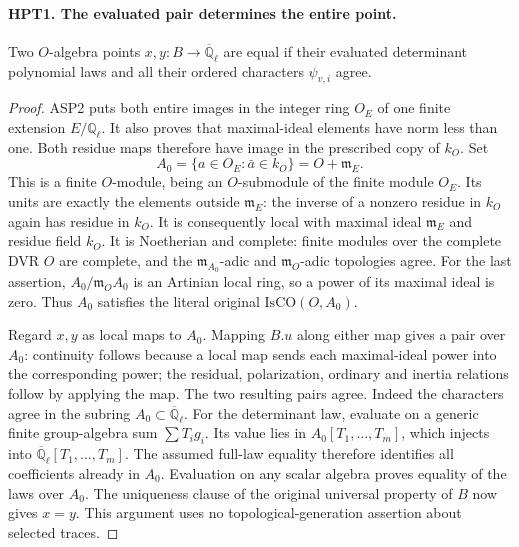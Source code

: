 \documentclass[11pt,a4paper]{article}
\numberwithin{equation}{section}
\theoremstyle{remark}\newtheorem{remark}[theorem]{Remark}
\begin{document}
\paragraph{HPT1. The evaluated pair determines the entire point.}
\label{claim:HPT1}
Two $O$-algebra points $x,y:B\to\overline{\mathbb Q}_\ell$ are equal
if their evaluated determinant polynomial laws and all their ordered
characters $\psi_{v,i}$ agree.
\begin{proof}
ASP2 puts both entire images in the integer ring $O_E$ of one finite
extension $E/\mathbb Q_\ell$.  It also proves that maximal-ideal
elements have norm less than one.  Both residue maps therefore have
image in the prescribed copy of $k_O$.  Set
\[
                A_0=\{a\in O_E:\bar a\in k_O\}=O+\mathfrak m_E.
\]
This is a finite $O$-module, being an $O$-submodule of the finite
module $O_E$.  Its units are exactly the elements outside
$\mathfrak m_E$: the inverse of a nonzero residue in $k_O$ again
has residue in $k_O$.  It is consequently local with maximal ideal
$\mathfrak m_E$ and residue field $k_O$.  It is Noetherian and
complete: finite modules over the complete DVR $O$ are complete,
and the $\mathfrak m_{A_0}$-adic and $\mathfrak m_O$-adic topologies
agree.  For the last assertion, $A_0/\mathfrak m_OA_0$ is an
Artinian local ring, so a power of its maximal ideal is zero.
Thus $A_0$ satisfies the literal original $\mathrm{IsCO}(O,A_0)$.

Regard $x,y$ as local maps to $A_0$.  Mapping $B.u$ along either
map gives a pair over $A_0$: continuity follows because a local
map sends each maximal-ideal power into the corresponding power;
the residual, polarization, ordinary and inertia relations follow
by applying the map.  The two resulting pairs agree.  Indeed the
characters agree in the subring $A_0\subset\overline{\mathbb Q}_\ell$.
For the determinant law, evaluate on a generic finite group-algebra
sum $\sum T_i g_i$.  Its value lies in $A_0[T_1,\ldots,T_m]$,
which injects into $\overline{\mathbb Q}_\ell[T_1,\ldots,T_m]$.
The assumed full-law equality therefore identifies all coefficients
already in $A_0$.  Evaluation on any scalar algebra proves equality
of the laws over $A_0$.  The uniqueness clause of the original
universal property of $B$ now gives $x=y$.  This argument uses no
topological-generation assertion about selected traces.
\end{proof}

\end{document}
